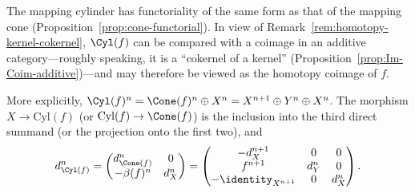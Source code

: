 The mapping cylinder has functoriality of the same form as that of the mapping
cone (Proposition~\ref{prop:cone-functorial}). In view of
Remark~\ref{rem:homotopy-kernel-cokernel}, $\Cyl(f)$ can be compared with a
coimage in an additive category---roughly speaking, it is a ``cokernel of a
kernel'' (Proposition~\ref{prop:Im-Coim-additive})---and may therefore be
viewed as the homotopy coimage of $f$.

More explicitly,
$\Cyl(f)^n=\Cone(f)^n\oplus X^n=X^{n+1}\oplus Y^n\oplus X^n$. The morphism
$X\to\mathrm{Cyl}(f)$ (or $\mathrm{Cyl}(f)\to\Cone(f)$) is the inclusion
into the third direct summand (or the projection onto the first two), and
\[ d_{\Cyl(f)}^n =
	\begin{pmatrix} d_{\Cone(f)}^n & 0 \\ -\beta(f)^n & d_X^n \end{pmatrix}
	= \begin{pmatrix}
		-d_X^{n+1} & 0 & 0 \\
		f^{n+1} & d_Y^n & 0 \\
		-\identity_{X^{n+1}} & 0 & d_X^n
\end{pmatrix} .\]


